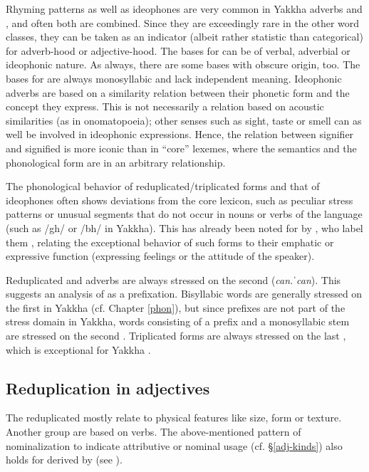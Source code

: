 Rhyming patterns as well as ideophones are very common in Yakkha adverbs and , and often both are combined. Since they are exceedingly rare in the other word classes, they can be taken as an indicator (albeit rather statistic than categorical) for adverb-hood or adjective-hood. The bases for  can be of verbal, adverbial or ideophonic nature. As always, there are some  bases with obscure origin, too. The bases for  are always monosyllabic and lack independent meaning. Ideophonic adverbs are based on a similarity relation between their phonetic form and the concept they express. This is not necessarily a relation based on acoustic similarities (as in onomatopoeia); other senses such as sight, taste or smell can as well be involved in ideophonic expressions. Hence, the relation between signifier and signified is more iconic than in “core” lexemes, where the semantics and the phonological form are in an arbitrary relationship.

The phonological behavior of reduplicated/triplicated forms and that of ideophones often shows deviations from the core lexicon, such as peculiar stress patterns or unusual segments that do not occur in nouns or verbs of the language (such as /gh/ or /bh/ in Yakkha). This has already been noted for  by \citet{Raietal1997Triplicated}, who label them , relating the exceptional behavior of such forms to their emphatic or expressive function (expressing feelings or the attitude of the speaker). 

Reduplicated  and adverbs are always stressed on the second  (\emph{can.ˈcan}). This suggests an analysis of  as a prefixation. Bisyllabic words are generally stressed on the first  in Yakkha (cf. Chapter \ref{phon}), but since prefixes are not part of the stress domain in Yakkha, words consisting of a prefix and a monosyllabic stem are stressed on the second . Triplicated forms are always stressed on the last , which is exceptional for Yakkha . 

\subsection{Reduplication in adjectives}

The reduplicated  mostly relate to physical features like size, form or texture. Another group are   based on  verbs. The above-mentioned pattern of nominalization to indicate attributive or nominal usage (cf. §\ref{adj-kinds}) also holds for  derived by  (see \Next). 

